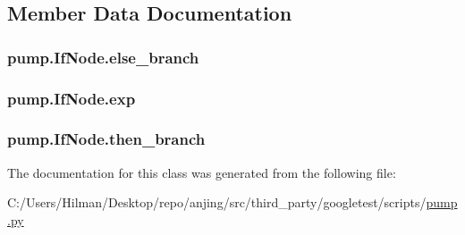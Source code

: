 \subsection{Member Data Documentation}
\hypertarget{classpump_1_1_if_node_a12e422b16ed4291f15cd95cd6e7f81eb}{}
\subsubsection[{else\+\_\+branch}]{\setlength{\rightskip}{0pt plus 5cm}pump.\+If\+Node.\+else\+\_\+branch}\label{classpump_1_1_if_node_a12e422b16ed4291f15cd95cd6e7f81eb}
\hypertarget{classpump_1_1_if_node_a92042e4262196ffd7366350539f512d8}{}
\subsubsection[{exp}]{\setlength{\rightskip}{0pt plus 5cm}pump.\+If\+Node.\+exp}\label{classpump_1_1_if_node_a92042e4262196ffd7366350539f512d8}
\hypertarget{classpump_1_1_if_node_aa9e2e488564629f8dc0d64d165a19ffa}{}
\subsubsection[{then\+\_\+branch}]{\setlength{\rightskip}{0pt plus 5cm}pump.\+If\+Node.\+then\+\_\+branch}\label{classpump_1_1_if_node_aa9e2e488564629f8dc0d64d165a19ffa}


The documentation for this class was generated from the following file\+:\begin{DoxyCompactItemize}
\item 
C\+:/\+Users/\+Hilman/\+Desktop/repo/anjing/src/third\+\_\+party/googletest/scripts/\hyperlink{pump_8py}{pump.\+py}\end{DoxyCompactItemize}
